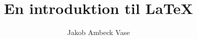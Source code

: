 \documentclass{report}
\begin{document}
\title{En introduktion til \LaTeX}

\author{Jakob Ambeck Vase}

\maketitle

\listoftodos




\printbibliography

\appendix


\end{document}
